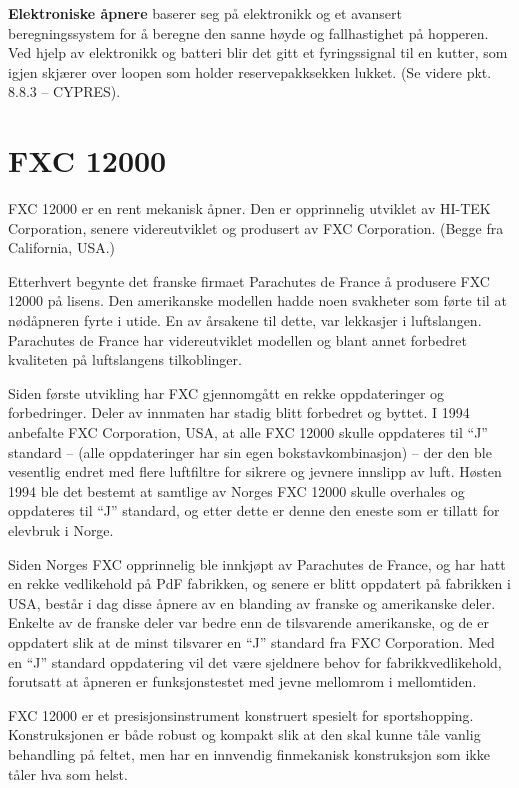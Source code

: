 \textbf{Elektroniske åpnere} baserer seg på elektronikk og et avansert beregningssystem for å beregne den sanne høyde og fallhastighet på hopperen. Ved hjelp av elektronikk og batteri blir det gitt et fyringssignal til en kutter, som igjen skjærer over loopen som holder reservepakksekken lukket. (Se videre pkt. 8.8.3 – CYPRES).

\section{FXC 12000}
FXC 12000 er en rent mekanisk åpner. Den er opprinnelig utviklet av HI-TEK Corporation, senere videreutviklet og produsert av FXC Corporation. (Begge fra California, USA.)

Etterhvert begynte det franske firmaet Parachutes de France å produsere FXC 12000 på lisens. Den amerikanske modellen hadde noen svakheter som førte til at nødåpneren fyrte i utide. En av årsakene til dette, var lekkasjer i luftslangen. Parachutes de France har videreutviklet modellen og blant annet forbedret kvaliteten på luftslangens tilkoblinger.

Siden første utvikling har FXC gjennomgått en rekke oppdateringer og forbedringer. Deler av innmaten har stadig blitt forbedret og byttet. I 1994 anbefalte FXC Corporation, USA, at alle FXC 12000 skulle oppdateres til ``J'' standard – (alle oppdateringer har sin egen bokstavkombinasjon) – der den ble vesentlig endret med flere luftfiltre for sikrere og jevnere innslipp av luft. Høsten 1994 ble det bestemt at samtlige av Norges FXC 12000 skulle overhales og oppdateres til ``J'' standard, og etter dette er denne den eneste som er tillatt for elevbruk i Norge.

Siden Norges FXC opprinnelig ble innkjøpt av Parachutes de France, og har hatt en rekke vedlikehold på PdF fabrikken, og senere er blitt oppdatert på fabrikken i USA, består i dag disse åpnere av en blanding av franske og amerikanske deler. Enkelte av de franske deler var bedre enn de tilsvarende amerikanske, og de er oppdatert slik at de minst tilsvarer en ``J'' standard fra FXC Corporation. Med en ``J'' standard oppdatering vil det være sjeldnere behov for fabrikkvedlikehold, forutsatt at åpneren er funksjonstestet med jevne mellomrom i mellomtiden.

FXC 12000 er et presisjonsinstrument konstruert spesielt for sportshopping. Konstruksjonen er både robust og kompakt slik at den skal kunne tåle vanlig behandling på feltet, men har en innvendig finmekanisk konstruksjon som ikke tåler hva som helst.

